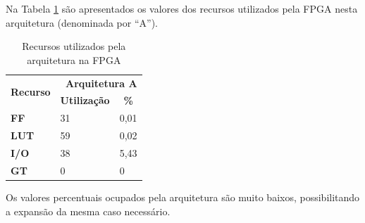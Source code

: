 \documentclass[11pt,a4paper]{article}
\begin{document}
	Na Tabela \ref{table:recursosA} são apresentados os valores dos recursos utilizados pela FPGA nesta arquitetura (denominada por ``A'').
		\begin{table}[h!]
			\centering
			\caption{Recursos utilizados pela arquitetura na FPGA}
				\label{table:recursosA}
				\begin{tabular}{l|ll}
					\hline
					\multicolumn{1}{c|}{\multirow{2}{*}{\textbf{Recurso}}} & \multicolumn{2}{r}{\textbf{Arquitetura A}} \\ \cline{2-3} 
					\multicolumn{1}{c|}{}                                  & \multicolumn{1}{c}{\textbf{Utilização}} & \multicolumn{1}{c}{\textbf{\%}} \\ \hline
					\textbf{FF}                                            & 31                                      & 0,01                            \\
					\textbf{LUT}                                           & 59                                      & 0,02                            \\
					\textbf{I/O}                                           & 38                                      & 5,43         			   		\\
					\textbf{GT}                                            & 0                                       & 0                               \\ \hline
				\end{tabular}%
		\end{table}
	
	Os valores percentuais ocupados pela arquitetura são muito baixos, possibilitando a expansão da mesma caso necessário. 
	
	
	
	
	
	
\end{document}
